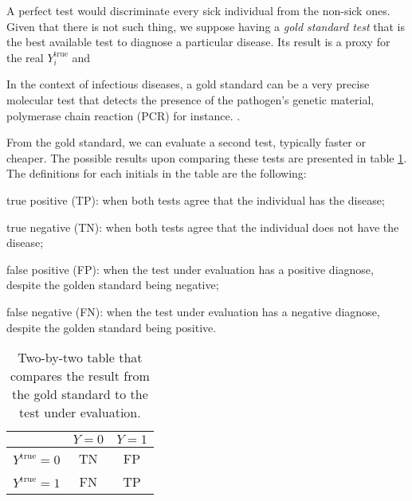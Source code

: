 A perfect test would discriminate every sick individual from the non-sick ones.
Given that there is not such thing, we suppose having a {\em gold standard
test} that is the best available test \cite{versi1992gold} to diagnose a
particular disease. Its result is a proxy for the real $Y^{\mathrm{true}}_i$ and 

\begin{citacao}
  In the context of infectious diseases, a gold standard can be a very precise
  molecular test that detects the presence of the pathogen’s genetic material,
  polymerase chain reaction (PCR) for instance. \cite[p. 125]{bastos2021modelling}.
\end{citacao}

From the gold standard, we can evaluate a second test, typically faster or
cheaper. The possible results upon comparing these tests are presented in
table \ref{table:two-by-two}. The definitions for each initials in the table
are the following: 

\begin{alineas}
  \item true positive (TP): when both tests agree that the individual has the
  disease;
  \item true negative (TN): when both tests agree that the individual does not
  have the disease;
  \item false positive (FP): when the test under evaluation has a positive
  diagnose, despite the golden standard being negative;
  \item false negative (FN): when the test under evaluation has a negative
  diagnose, despite the golden standard being positive.
\end{alineas}

\begin{table}[!ht]
  \centering
  \begin{tabular}{c|c|c|}
  \cline{2-3}
                                               & $Y = 0$ & $Y = 1$ \\ \hline
  \multicolumn{1}{|c|}{$Y^{\mathrm{true}}= 0$} & TN    & FP    \\ \hline
  \multicolumn{1}{|c|}{$Y^{\mathrm{true}}= 1$} & FN    & TP    \\ \hline
  \end{tabular}
  \caption{Two-by-two table that compares the result from the gold standard to
  the test under evaluation.}
  \label{table:two-by-two}
\end{table}


